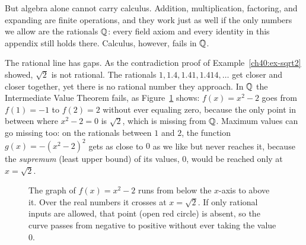 But algebra alone cannot carry calculus. Addition, multiplication, factoring, and
expanding are finite operations, and they work just as well if the only numbers
we allow are the rationals $\mathbb{Q}$: every field axiom and every identity in this
appendix still holds there. Calculus, however, fails in $\mathbb{Q}$.

The rational line has gaps. As the contradiction proof of
Example~\ref{ch40:ex-sqrt2} showed, $\sqrt{2}$ is not rational. The rationals
$1, 1.4, 1.41, 1.414, \dots$ get closer and closer together, yet there is no
rational number they approach. In $\mathbb{Q}$ the Intermediate Value Theorem fails, as
Figure~\ref{ch40:fig-rational-gap} shows: $f(x) = x^2 - 2$ goes from $f(1) = -1$
to $f(2) = 2$ without ever equaling zero, because the only point in between where
$x^2-2=0$ is $\sqrt{2}$, which is missing from $\mathbb{Q}$. Maximum values can go missing
too: on the rationals between $1$ and $2$, the function $g(x) = -(x^2-2)^2$ gets
as close to $0$ as we like but never reaches it, because the \emph{supremum}
(least upper bound) of its values, $0$, would be reached only at $x=\sqrt2$.

\begin{figure}[htbp]
\centering
{}
\caption{The graph of $f(x)=x^2-2$ runs from below the $x$-axis to above it.
Over the real numbers it crosses at $x=\sqrt2$. If only rational inputs are
allowed, that point (open red circle) is absent, so the curve passes from
negative to positive without ever taking the value $0$.}
\label{ch40:fig-rational-gap}
\end{figure}

